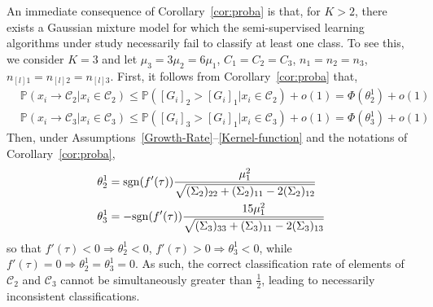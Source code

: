 \documentclass[twoside,11pt]{article}
\begin{document}
An immediate consequence of Corollary~\ref{cor:proba} is that, for $K>2$, there exists a Gaussian mixture model for which the semi-supervised learning algorithms under study necessarily fail to classify at least one class. To see this, we consider $K=3$ and let $\mu_3=3\mu_2=6\mu_1$, $C_1=C_2=C_3$, $n_1=n_2=n_3$, $n_{[l]1}=n_{[l]2}=n_{[l]3}$. First, it follows from Corollary~\ref{cor:proba} that,
\begin{align*}
	&{\mathbb P}\left(x_{i}\to\mathcal{C}_{2}|x_{i}\in\mathcal{C}_{2}\right)\leq{\mathbb P}\left([G_{i}]_2>[G_i]_1|x_{i}\in\mathcal{C}_{2}\right)+o(1)=\Phi(\theta_2^1)+o(1)\\
	&{\mathbb P}\left(x_{i}\to\mathcal{C}_{3}|x_{i}\in\mathcal{C}_{3}\right)\leq{\mathbb P}\left([G_{i}]_3>[G_i]_1|x_{i}\in\mathcal{C}_{3}\right)+o(1)=\Phi(\theta_3^1)+o(1)
\end{align*}
Then, under Assumptions~\ref{Growth-Rate}--\ref{Kernel-function} and the notations of Corollary~\ref{cor:proba},
\begin{align*}
	\theta_2^1 &= {\rm sgn}(f'(\tau)) \frac{\mu_1^2}{\sqrt{(\Sigma_2)_{22}+(\Sigma_2)_{11}-2(\Sigma_2)_{12}}} \\
	\theta_3^1 &= -{\rm sgn}(f'(\tau)) \frac{15\mu_1^2}{\sqrt{(\Sigma_3)_{33}+(\Sigma_3)_{11}-2(\Sigma_3)_{13}}}
\end{align*}
so that $f'(\tau)<0\Rightarrow \theta_2^1<0$, $f'(\tau)>0\Rightarrow \theta_3^1<0$, while $f'(\tau)=0\Rightarrow \theta_2^1=\theta_3^1=0$. As such, the correct classification rate of elements of $\mathcal C_2$ and $\mathcal C_3$ cannot be simultaneously greater than $\frac12$, leading to necessarily inconsistent classifications. 

\medskip
\end{document}
